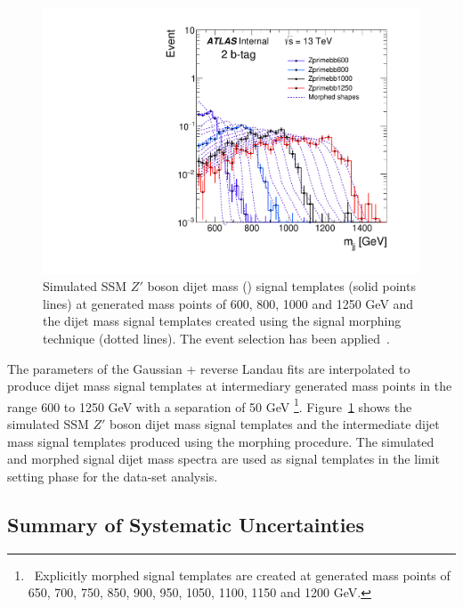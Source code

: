 \begin{figure}[!b]
  \vspace{-1.2em}
\begin{center}
  \includegraphics[width=0.55\linewidth, angle=0]{figs/Dibjet/LowMass/lim-morphing.pdf} 
\end{center}
\vspace{-2em}
\caption[Simulated SSM $Z'$ boson dijet mass signal templates and the intermediate dijet mass signal templates
  created using the signal morphing technique used in the \lm{} data-set limit setting phase.]
        {Simulated SSM $Z'$ boson dijet mass (\mjj) signal templates (solid points lines)
          at generated mass points of 600, 800, 1000 and 1250 GeV 
          and the dijet mass signal templates created using the signal morphing technique (dotted lines). The \lm{} event selection has been applied~\cite{dibjet-full_int}.
          \label{fig:lim-full_morphing}}
\end{figure}

The parameters of the Gaussian + reverse Landau fits are interpolated to produce dijet mass signal templates at intermediary generated mass points
in the range 600 to 1250 GeV with a separation of 50 GeV \footnote{\ Explicitly morphed signal templates are created at generated mass points of 650, 700, 750, 850, 900, 950, 1050, 1100, 1150 and 1200 GeV.}.
Figure~\ref{fig:lim-full_morphing} shows the simulated SSM $Z'$ boson dijet mass signal templates and the intermediate dijet mass signal templates produced using the morphing procedure.
The simulated and morphed signal dijet mass spectra are used as signal templates in the limit setting phase for the \lm{} data-set analysis.


\subsection{Summary of Systematic Uncertainties}
\label{sec:lim-full_systs}

